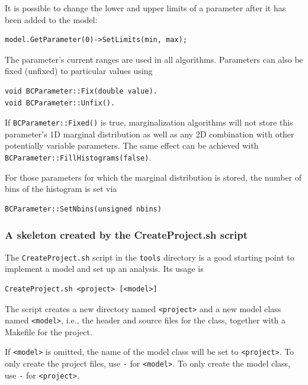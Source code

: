 \documentclass[11pt, a4paper]{article}
\begin{document}
It is possible to change the lower and upper limits of a parameter
after it has been added to the model:
%
\begin{verbatim}
model.GetParameter(0)->SetLimits(min, max);
\end{verbatim}
%
The parameter's current ranges are used in all algorithms. Parameters
can also be fixed (unfixed) to particular values using
%
\begin{verbatim}
void BCParameter::Fix(double value).
void BCParameter::Unfix().
\end{verbatim}
%
If \texttt{BCParameter::Fixed()} is true, marginalization algorithms
will not store this parameter's 1D marginal distribution as well as
any 2D combination with other potentially variable parameters. The same
effect can be achieved with \texttt{BCParameter::FillHistograms(false)}.

For those parameters for which the marginal distribution is stored,
the number of bins of the histogram is set via
\begin{verbatim}
BCParameter::SetNbins(unsigned nbins)
\end{verbatim}



\subsubsection{A skeleton created by the CreateProject.sh script}
\label{subsubsection:createproject}

The \verb|CreateProject.sh| script in the \verb|tools| directory is a
good starting point to implement a model and set up an analysis. Its
usage is
%
\begin{verbatim}
CreateProject.sh <project> [<model>]
\end{verbatim}

The script creates a new directory named \verb|<project>| and a new
model class named \verb|<model>|, i.e., the header and source files
for the class, together with a Makefile for the project.

If \verb|<model>| is omitted, the name of the model class will be set
to \verb|<project>|.  To only create the project files, use \verb|-|
for \verb|<model>|.  To only create the model class, use \verb|-| for
\verb|<project>|.
\end{document}

